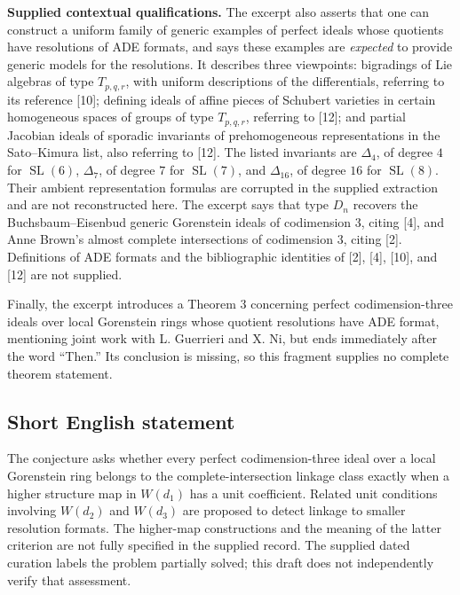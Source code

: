 \documentclass[11pt]{article}
\begin{document}
\textbf{Supplied contextual qualifications.} The excerpt also asserts that one can construct a uniform family of generic examples of perfect ideals whose quotients have resolutions of ADE formats, and says these examples are \emph{expected} to provide generic models for the resolutions. It describes three viewpoints: bigradings of Lie algebras of type \(T_{p,q,r}\), with uniform descriptions of the differentials, referring to its reference [10]; defining ideals of affine pieces of Schubert varieties in certain homogeneous spaces of groups of type \(T_{p,q,r}\), referring to [12]; and partial Jacobian ideals of sporadic invariants of prehomogeneous representations in the Sato--Kimura list, also referring to [12]. The listed invariants are \(\Delta_4\), of degree \(4\) for \(\operatorname{SL}(6)\), \(\Delta_7\), of degree \(7\) for \(\operatorname{SL}(7)\), and \(\Delta_{16}\), of degree \(16\) for \(\operatorname{SL}(8)\). Their ambient representation formulas are corrupted in the supplied extraction and are not reconstructed here. The excerpt says that type \(D_n\) recovers the Buchsbaum--Eisenbud generic Gorenstein ideals of codimension \(3\), citing [4], and Anne Brown's almost complete intersections of codimension \(3\), citing [2]. Definitions of ADE formats and the bibliographic identities of [2], [4], [10], and [12] are not supplied.

Finally, the excerpt introduces a Theorem 3 concerning perfect codimension-three ideals over local Gorenstein rings whose quotient resolutions have ADE format, mentioning joint work with L. Guerrieri and X. Ni, but ends immediately after the word ``Then.'' Its conclusion is missing, so this fragment supplies no complete theorem statement.
\subsection{Short English statement}
The conjecture asks whether every perfect codimension-three ideal over a local Gorenstein ring belongs to the complete-intersection linkage class exactly when a higher structure map in \(W(d_1)\) has a unit coefficient. Related unit conditions involving \(W(d_2)\) and \(W(d_3)\) are proposed to detect linkage to smaller resolution formats. The higher-map constructions and the meaning of the latter criterion are not fully specified in the supplied record. The supplied dated curation labels the problem partially solved; this draft does not independently verify that assessment.
\end{document}
